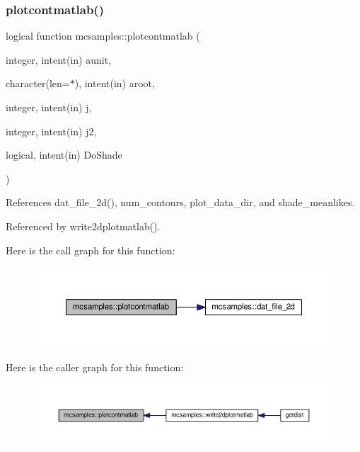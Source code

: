 \subsubsection{\texorpdfstring{plotcontmatlab()}{plotcontmatlab()}}
{\footnotesize\ttfamily logical function mcsamples\+::plotcontmatlab (\begin{DoxyParamCaption}\item[{integer, intent(in)}]{aunit,  }\item[{character(len=$\ast$), intent(in)}]{aroot,  }\item[{integer, intent(in)}]{j,  }\item[{integer, intent(in)}]{j2,  }\item[{logical, intent(in)}]{Do\+Shade }\end{DoxyParamCaption})}



References dat\+\_\+file\+\_\+2d(), num\+\_\+contours, plot\+\_\+data\+\_\+dir, and shade\+\_\+meanlikes.



Referenced by write2dplotmatlab().

Here is the call graph for this function\+:
\nopagebreak
\begin{figure}[H]
\begin{center}
\leavevmode
\includegraphics[width=350pt]{namespacemcsamples_a12e5ebfb72dd60020dd1aef9afa7ad2e_cgraph}
\end{center}
\end{figure}
Here is the caller graph for this function\+:
\nopagebreak
\begin{figure}[H]
\begin{center}
\leavevmode
\includegraphics[width=350pt]{namespacemcsamples_a12e5ebfb72dd60020dd1aef9afa7ad2e_icgraph}
\end{center}
\end{figure}
\mbox{\label{namespacemcsamples_a61ce07e713757fee14a963684c25fe12}} 
